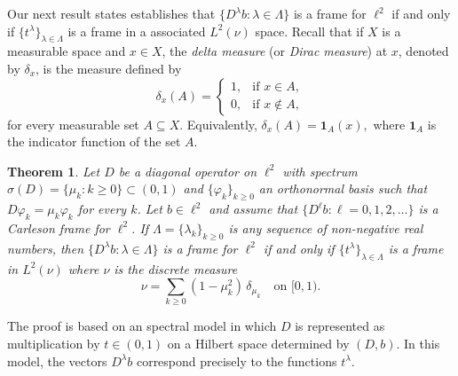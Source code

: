\documentclass[11pt]{amsart}
\newtheorem{thm}{Theorem}[section]
\theoremstyle{definition}
\theoremstyle{remark}
\numberwithin{equation}{section}
\def\phi{\varphi}
\begin{document}
Our next result states establishes that $\{D^{\lambda}b:\lambda\in\Lambda\}$ is a frame for $\ell^2$ if and only if $\{t^{\lambda}\}_{\lambda\in\Lambda}$ is a frame in a associated $L^2(\nu)$ space. Recall that if  \(X\) is a measurable space and \(x \in X\),  the \emph{delta measure} (or \emph{Dirac measure}) at \(x\), denoted by \(\delta_x\), is the measure defined by
\[
\delta_x(A) =
\begin{cases}
1, & \text{if } x \in A, \\
0, & \text{if } x \notin A,
\end{cases}
\]
for every measurable set \(A \subseteq X\). Equivalently, $\delta_x(A) = \mathbf{1}_A(x),$ where \(\mathbf{1}_A\) is the indicator function of the set \(A\).


\begin{thm}\label{prop-ms}
Let $D$ be a diagonal operator on $\ell^2$ with spectrum
$\sigma(D)=\{\mu_k:k\ge 0\}\subset(0,1)$ and $\{\phi_k\}_{k\geq 0}$ an orthonormal basis such that $D\phi_k=\mu_k\phi_k$ for every $k$.
Let $b\in\ell^2$ and assume that $\{D^{\ell} b:\ell=0,1,2,\dots\}$ is a Carleson frame for $\ell^2$. If $\Lambda=\{\lambda_k\}_{k\geq 0}$ is any sequence of non-negative real numbers, then $\{D^\lambda b:\lambda\in\Lambda\}$
is a frame for $\ell^2$ if and only if $\{t^{\lambda}\}_{\lambda\in\Lambda}$ is a frame in $L^2(\nu)$ where $\nu$ is the discrete measure
\[
\nu= \sum_{k\ge 0} (1-\mu_k^2)\,\delta_{\mu_k}
\quad\text{on } [0,1).
\]
\end{thm}




The proof is based on an spectral model in which $D$ is represented as multiplication by $t\in(0,1)$ on a Hilbert space determined by $(D,b)$.
In this model, the vectors $D^{\lambda}b$ correspond precisely to the functions $t^{\lambda}$.
\end{document}
